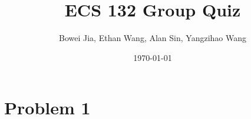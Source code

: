 \documentclass[11pt]{article}
\title{ECS 132 Group Quiz}
\author{Bowei Jia, Ethan Wang, Alan Sin, Yangzihao Wang}
\date{\today}
\newcommand{\matindex}[1]{\mbox{\scriptsize#1}}
\begin{document}
\maketitle

\begin{comment}
\begin{align*}
E(L_2) &= E(L_1 - A_2 + B_2) \\
&=E(L_1) - E(A_2) + E(B_2) \\
&=(0.4\times 1 + 0.1\times 2) \times 2 - E(A_2) \\
E(A_2) &= \sum_{c}P(L_1=c)E(A_2|L_1=c) \\
&=0 + 0.4E(A_2|L_1=1) + 0.1E(A_2|L_1=2) \\
&=0.4 \times 0.2 \times 1 + 0.1 \times (0.2 \times 0.8 \times \binom{2}{1} \times 1 + 0.2 \times 0.2 \times 2) \\
&= 0.12\\
E(L_2) &= 1.2 - 0.12 = 1.08
\end{align*}

First define the initial state matrix $P$:
\[
  P=\begin{blockarray}{c@{\hspace{5pt}}rrrr@{\hspace{5pt}}cl}
    & \matindex{1} & \matindex{2} & \matindex{3} & \matindex{4} & & \\
    \begin{block}{(c@{\hspace{5pt}}rrrr@{\hspace{5pt}}c)l}
      & 0 &  \frac{1}{3} & \frac{1}{3} & \frac{1}{3} & & \matindex{1} \\
      & 0 &  0 & \frac{2}{3} & \frac{1}{3} & & \matindex{2} \\
      & 0 &  \frac{1}{3} & \frac{1}{3} & \frac{1}{3} & & \matindex{3} \\
      & \frac{1}{3} &  \frac{1}{3} & \frac{1}{3} & 0 & & \matindex{4} \\
    \end{block}
  \end{blockarray}
\]
Reasoning:
\begin{itemize}
\item[At state 1:] 
\item[At state 2:] 
\item[At state 3:]
\item[At state 4:]
\end{itemize}
\end{comment}

\section*{Problem 1}
\end{document}
